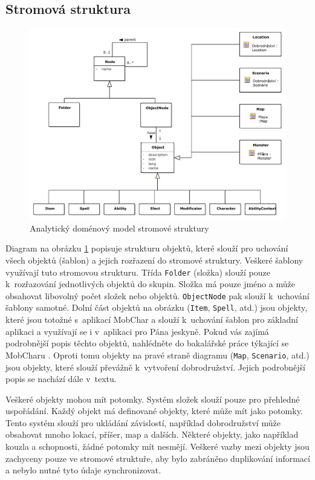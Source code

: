 \documentclass[thesis=B,czech]{resources/FITthesis}[2012/06/26]
\begin{document}
\subsection{Stromová struktura}
\begin{figure}\centering
	\includegraphics[width=1\textwidth]{images/domain_struktura}
	\caption[Analytický doménový model stromové struktury]{Analytický doménový model stromové struktury}\label{fig:dm_stromova_struktura}
\end{figure}
Diagram na obrázku \ref{fig:dm_stromova_struktura} popisuje strukturu objektů, které slouží pro uchování všech objektů (šablon) a jejich rozřazení do stromové struktury. Veškeré šablony využívají tuto stromovou strukturu. Třída \texttt{Folder} (složka) slouží pouze k~rozřazování jednotlivých objektů do skupin. Složka má pouze jméno a může obsahovat libovolný počet složek nebo objektů. \texttt{ObjectNode} pak slouží k~uchování šablony samotné. Dolní část objektů na obrázku (\texttt{Item}, \texttt{Spell}, atd.) jsou objekty, které jsou totožné s~aplikací MobChar a slouží k~uchování šablon pro základní aplikaci a využívají se i v~aplikaci pro Pána jeskyně. Pokud vás zajímá podrobnější popis těchto objektů, nahlédněte do bakalářské práce týkající se MobCharu \cite{Weberova_2017}. Oproti tomu objekty na pravé straně diagramu (\texttt{Map}, \texttt{Scenario}, atd.) jsou objekty, které slouží převážně k~vytvoření dobrodružství. Jejich podrobnější popis se nachází dále v~textu.\par

Veškeré objekty mohou mít potomky. Systém složek slouží pouze pro přehledné uspořádání. Každý objekt má definované objekty, které může mít jako potomky. Tento systém slouží pro ukládání závislostí, například dobrodružství může obsahovat mnoho lokací, příšer, map a dalších. Některé objekty, jako například kouzla a schopnosti, žádné potomky mít nesmějí. Veškeré vazby mezi objekty jsou zachyceny pouze ve stromové struktuře, aby bylo zabráněno duplikování informací a nebylo nutné tyto údaje synchronizovat.
\end{document}
